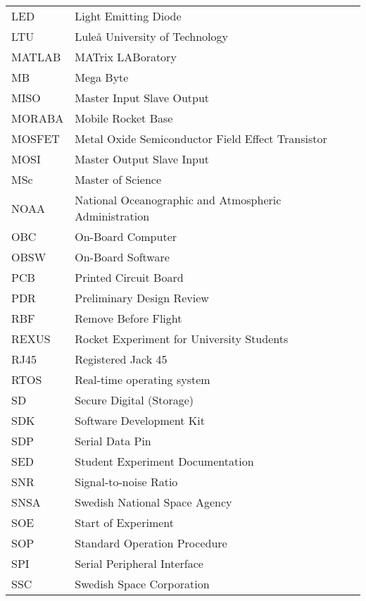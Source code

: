 \begin{longtable}{p{3cm} p{9cm}}
             LED         & Light Emitting Diode\\
             LTU         & Luleå University of Technology \\
             MATLAB      & MATrix LABoratory\\
             MB          & Mega Byte\\
             MISO        & Master Input Slave Output\\
             MORABA      & Mobile Rocket Base \\
             MOSFET      & Metal Oxide Semiconductor Field Effect Transistor\\
             MOSI        & Master Output Slave Input\\
             MSc         & Master of Science \\
             NOAA        & National Oceanographic and Atmospheric Administration \\
             OBC         & On-Board Computer\\
             OBSW        & On-Board Software\\
             PCB         & Printed Circuit Board\\
             PDR         & Preliminary Design Review\\
             RBF	 & Remove Before Flight\\
             REXUS       & Rocket Experiment for University Students \\
             RJ45        & Registered Jack 45 \\
             RTOS        & Real-time operating system\\
             SD          & Secure Digital (Storage) \\
             SDK         & Software Development Kit\\
             SDP         & Serial Data Pin\\
             SED         & Student Experiment Documentation \\
             SNR         & Signal-to-noise Ratio\\
             SNSA        & Swedish National Space Agency \\
             SOE         & Start of Experiment\\
             SOP         & Standard Operation Procedure\\
             SPI         & Serial Peripheral Interface\\
             SSC         & Swedish Space Corporation \\

\end{longtable}
